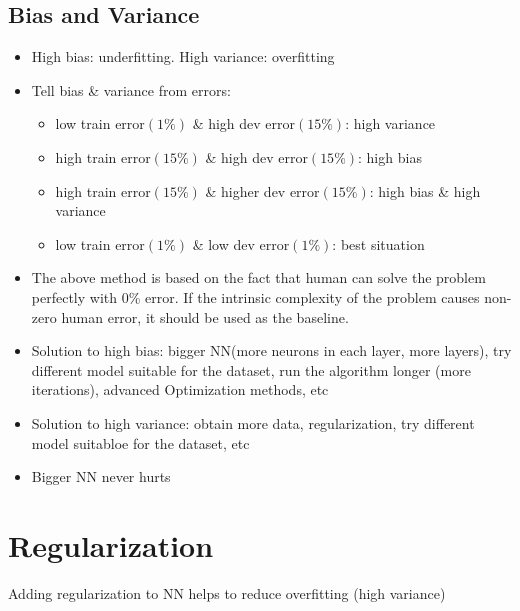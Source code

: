\subsection{Bias and Variance}
\begin{itemize}
  \item High bias: underfitting. High variance: overfitting
  \item Tell bias \& variance from errors:
    \begin{itemize}
      \item low train error$(1\%)$ \& high dev error$(15\%)$: high variance
      \item high train error$(15\%)$ \& high dev error$(15\%)$: high bias
      \item high train error$(15\%)$ \& higher dev error$(15\%)$: high bias \& high variance
      \item low train error$(1\%)$ \& low dev error$(1\%)$: best situation 
    \end{itemize}
  \item The above method is based on the fact that human can solve the problem perfectly with 0\% error. If the intrinsic complexity of the problem causes non-zero human error, it should be used as the baseline. 
  \item Solution to high bias: bigger NN(more neurons in each layer, more layers), try different model suitable for the dataset, run the algorithm longer (more iterations), advanced Optimization methods, etc
  \item Solution to high variance: obtain more data, regularization, try different model suitabloe for the dataset, etc
  \item Bigger NN never hurts
\end{itemize}
\section{Regularization}
Adding regularization to NN helps to reduce overfitting (high variance)
